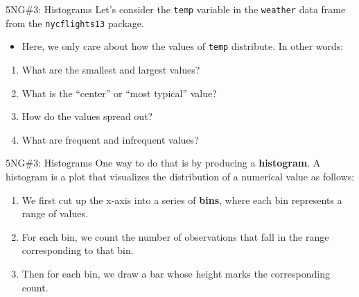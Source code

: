 \documentclass[
  ignorenonframetext,
]{beamer}
\providecommand{\tightlist}{%
  \setlength{\itemsep}{0pt}\setlength{\parskip}{0pt}}
\begin{document}
\begin{frame}[fragile]{5NG\#3: Histograms}
\protect\hypertarget{ng3-histograms}{}
Let's consider the \texttt{temp} variable in the \texttt{weather} data
frame from the \texttt{nycflights13} package.

\begin{itemize}
\tightlist
\item
  Here, we only care about how the values of \texttt{temp} distribute.
  In other words:
\end{itemize}

\begin{enumerate}
\tightlist
\item
  What are the smallest and largest values?
\item
  What is the ``center'' or ``most typical'' value?
\item
  How do the values spread out?
\item
  What are frequent and infrequent values?
\end{enumerate}
\end{frame}

\begin{frame}{5NG\#3: Histograms}
\protect\hypertarget{ng3-histograms-1}{}
One way to do that is by producing a \textbf{histogram}. A histogram is
a plot that visualizes the distribution of a numerical value as follows:

\begin{enumerate}
\item
  We first cut up the x-axis into a series of \textbf{bins}, where each
  bin represents a range of values.
\item
  For each bin, we count the number of observations that fall in the
  range corresponding to that bin.
\item
  Then for each bin, we draw a bar whose height marks the corresponding
  count.
\end{enumerate}
\end{frame}
\end{document}
